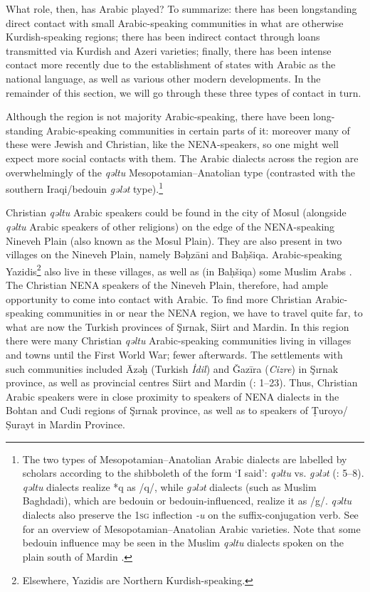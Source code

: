 \documentclass[output=paper]{langsci/langscibook}
\begin{document}
What role, then, has Arabic played? To summarize: there has been longstanding direct contact with small Arabic-speaking communities in what are otherwise Kurdish-speaking regions; there has been indirect contact through loans transmitted via Kurdish and Azeri varieties; finally, there has been intense contact more recently due to the establishment of states with Arabic as the national language, as well as various other modern developments. In the remainder of this section, we will go through these three types of contact in turn.

Although the region is not majority Arabic-speaking, there have been long-standing Arabic-speaking communities in certain parts of it: moreover many of these were Jewish and Christian, like the NENA-speakers, so one might well expect more social contacts with them. The Arabic dialects across the region are overwhelmingly of the \textit{qəltu} Mesopotamian–Anatolian type (contrasted with the southern Iraqi/bedouin \textit{gələt} type).\footnote{The two types of Mesopotamian–Anatolian Arabic dialects are labelled by scholars according to the shibboleth of the form ‘I said’: \textit{qəltu} vs. \textit{gələt} (\citealt{Blanc1964}: 5–8). \textit{qəltu} dialects realize *q as /q/, while \textit{gələt} dialects (such as Muslim Baghdadi), which are bedouin or bedouin-influenced, realize it as /g/. \textit{qəltu} dialects also preserve the 1\textsc{sg} inflection \textit{-u} on the suffix-conjugation verb. See \citet{Talay2011} for an overview of Mesopotamian--Anatolian Arabic varieties. Note that some bedouin influence may be seen in the Muslim \textit{qəltu} dialects spoken on the plain south of Mardin \citep[30]{Jastrow1978}.}

Christian \textit{qəltu} Arabic speakers could be found in the city of Mosul (alongside \textit{qəltu} Arabic speakers of other religions) on the edge of the NENA-speaking Nineveh Plain (also known as the Mosul Plain). They are also present in two villages on the Nineveh Plain, namely Bəḥzāni and Baḥšiqa. Arabic-speaking Yazidis\footnote{Elsewhere, Yazidis are Northern Kurdish-speaking.} also live in these villages, as well as (in Baḥšiqa) some Muslim Arabs \citep[24]{Jastrow1978}. The Christian NENA speakers of the Nineveh Plain, therefore, had ample opportunity to come into contact with Arabic. To find more Christian Arabic-speaking communities in or near the NENA region, we have to travel quite far, to what are now the Turkish provinces of Şırnak, Siirt and Mardin. In this region there were many Christian \textit{qəltu} Arabic-speaking communities living in villages and towns until the First World War; fewer afterwards. The settlements with such communities included Āzəḫ (Turkish \textit{İdil}) and Ǧazīra (\textit{Cizre}) in Şırnak province, as well as provincial centres Siirt and Mardin (\citealt{Jastrow1978}: 1–23). Thus, Christian Arabic speakers were in close proximity to speakers of NENA dialects in the Bohtan and Cudi regions of Şırnak province, as well as to speakers of Ṭuroyo/Ṣurayt in Mardin Province.
\end{document}
